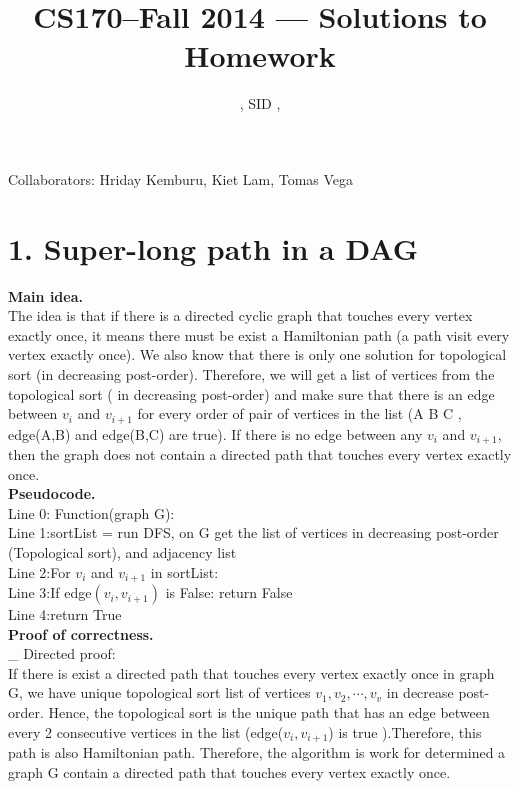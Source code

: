 \documentclass[11pt]{article}
\title{CS170--Fall 2014 --- Solutions to Homework \Homework}
\author{\Name, SID \SID, \texttt{\Login}}
\newcommand{\tab}{\hspace*{2em}}
\begin{document}
\maketitle

\noindent
Collaborators: Hriday Kemburu, Kiet Lam, Tomas Vega

\section*{1. Super-long path in a DAG}
\noindent
\Large{}
\textbf{Main idea.}\\
The idea is that if there is a directed cyclic graph that touches every vertex exactly once, it means there must be exist a Hamiltonian path (a path visit every vertex exactly once). We also know that there is only one solution for topological sort (in decreasing post-order). Therefore, we will get a list of vertices from the topological sort ( in decreasing post-order) and make sure that there is an edge between $v_i$ and $v_{i+1}$ for every order of pair of vertices in the list (A B C , edge(A,B) and edge(B,C) are true). If there is no edge between any $v_i$ and $v_{i+1}$, then the graph does not contain a directed path that touches every vertex exactly once.\\ 

\noindent
\textbf{Pseudocode.}\\
Line 0: Function(graph G): \\
Line 1:\tab sortList = run DFS, on G get the list of vertices in decreasing post-order (Topological sort), and adjacency list\\
Line 2:\tab For $v_i$ and $v_{i + 1}$ in sortList:\\
Line 3:\tab\tab If edge$(v_i, v_{i+1})$ is False: return False\\
Line 4:\tab return True\\

\noindent
\Large{}
\textbf{Proof of correctness.}\\
\_ Directed proof:\\
If there is exist a directed path that touches every vertex exactly once in graph G, we have unique topological sort list of vertices $v_1, v_2, \cdots, v_v$ in decrease post-order. Hence, the topological sort is the unique path that has an edge between every 2 consecutive vertices in the list (edge($v_i,v_{i+1}$) is true ).Therefore, this path is also Hamiltonian path. Therefore, the algorithm is work for determined a graph G contain a directed path that touches every vertex exactly once. \\
\end{document}
